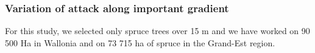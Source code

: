 \documentclass[3p,procedia]{elsarticle}
\begin{document}
\subsubsection{Variation of attack along important gradient}
For this study, we selected only spruce trees over 15 m and we have worked on 90 500 Ha in Wallonia and  on 73 715 ha of spruce in the Grand-Est region.  
			









\end{document}

